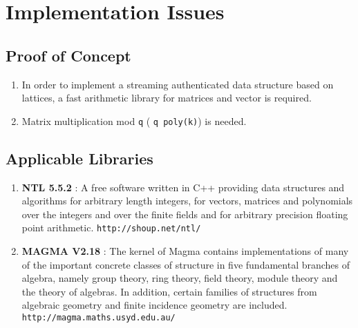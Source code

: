 \documentclass[11pt, letterpaper, oneside]{article}
\begin{document}



\section{Implementation Issues}
\subsection{Proof of Concept}
\begin{enumerate}
\item In order to implement a streaming authenticated data structure based on lattices, a fast
arithmetic library for matrices and vector is required.
\item Matrix multiplication mod \texttt{q} ( \texttt{q poly(k)}) is needed.
\end{enumerate}

\subsection{Applicable Libraries}
\begin{enumerate}
\item \textbf{NTL 5.5.2} : A free software written in C++ providing data structures and algorithms for arbitrary length
integers, for vectors, matrices and polynomials over the integers and over the finite fields and for
arbitrary precision floating point arithmetic. \texttt{http://shoup.net/ntl/}
\item \textbf{MAGMA V2.18} : The kernel of Magma contains implementations of many of the important concrete classes of structure in five fundamental branches of algebra, namely group theory, ring theory, field theory, module theory and the theory of algebras.
In addition, certain families of structures from algebraic geometry and finite incidence geometry are included. \texttt{http://magma.maths.usyd.edu.au/}
\end{enumerate}
\end{document}
